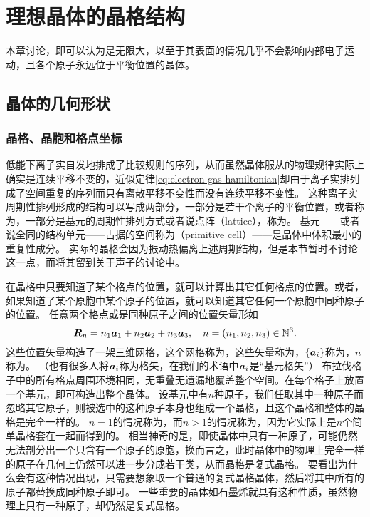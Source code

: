 
\chapter{理想晶体的晶格结构}\label{chap:lattice-structure}

本章讨论，即可以认为是无限大，以至于其表面的情况几乎不会影响内部电子运动，且各个原子永远位于平衡位置的晶体。

\section{晶体的几何形状}

\subsection{晶格、晶胞和格点坐标}

低能下离子实自发地排成了比较规则的序列，从而虽然晶体服从的物理规律实际上确实是连续平移不变的，近似定律\eqref{eq:electron-gas-hamiltonian}却由于离子实排列成了空间重复的序列而只有离散平移不变性而没有连续平移不变性。
这种离子实周期性排列形成的结构可以写成两部分，一部分是若干个离子的平衡位置，或者称为，一部分是基元的周期性排列方式或者说点阵（lattice），称为。
基元——或者说全同的结构单元——占据的空间称为（primitive cell）——是晶体中体积最小的重复性成分。
实际的晶格会因为振动热偏离上述周期结构，但是本节暂时不讨论这一点，而将其留到关于声子的讨论中。

在晶格中只要知道了某个格点的位置，就可以计算出其它任何格点的位置。或者，如果知道了某个原胞中某个原子的位置，就可以知道其它任何一个原胞中同种原子的位置。
任意两个格点或是同种原子之间的位置矢量形如
\begin{equation}
    \vb*{R}_n = n_1 \vb*{a}_1 + n_2 \vb*{a}_2 + n_3 \vb*{a}_3, \quad n = (n_1, n_2, n_3) \in \mathbb{N}^3.
\end{equation}
这些位置矢量构造了一架三维网格，这个网格称为，这些矢量称为，$\{\vb*{a}_i\}$称为，$n$称为。
（也有很多人将$\vb*{a}_i$称为格矢，在我们的术语中$\vb*{a}_i$是“基元格矢”）
布拉伐格子中的所有格点周围环境相同，无重叠无遗漏地覆盖整个空间。在每个格子上放置一个基元，即可构造出整个晶体。
设基元中有$n$种原子，我们任取其中一种原子而忽略其它原子，则被选中的这种原子本身也组成一个晶格，且这个晶格和整体的晶格是完全一样的。
$n=1$的情况称为，而$n>1$的情况称为，因为它实际上是$n$个简单晶格套在一起而得到的。
相当神奇的是，即使晶体中只有一种原子，可能仍然无法剖分出一个只含有一个原子的原胞，换而言之，此时晶体中的物理上完全一样的原子在几何上仍然可以进一步分成若干类，从而晶格是复式晶格。
要看出为什么会有这种情况出现，只需要想象取一个普通的复式晶格晶体，然后将其中所有的原子都替换成同种原子即可。
一些重要的晶体如石墨烯就具有这种性质，虽然物理上只有一种原子，却仍然是复式晶格。

